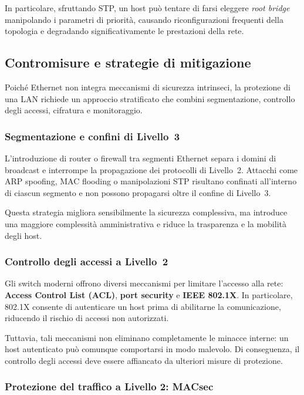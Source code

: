 In particolare, sfruttando STP, un host può tentare di farsi eleggere \emph{root bridge}
manipolando i parametri di priorità, causando riconfigurazioni frequenti della topologia
e degradando significativamente le prestazioni della rete.

\subsection{Contromisure e strategie di mitigazione}

Poiché Ethernet non integra meccanismi di sicurezza intrinseci,
la protezione di una LAN richiede un approccio stratificato che combini
segmentazione, controllo degli accessi, cifratura e monitoraggio.

\subsubsection{Segmentazione e confini di Livello~3}

L’introduzione di router o firewall tra segmenti Ethernet separa i domini di broadcast
e interrompe la propagazione dei protocolli di Livello~2.
Attacchi come ARP spoofing, MAC flooding o manipolazioni STP risultano confinati
all’interno di ciascun segmento e non possono propagarsi oltre il confine di Livello~3.

Questa strategia migliora sensibilmente la sicurezza complessiva,
ma introduce una maggiore complessità amministrativa
e riduce la trasparenza e la mobilità degli host.

\subsubsection{Controllo degli accessi a Livello~2}

Gli switch moderni offrono diversi meccanismi per limitare l’accesso alla rete:
\textbf{Access Control List (ACL)}, \textbf{port security} e \textbf{IEEE 802.1X}.
In particolare, 802.1X consente di autenticare un host prima di abilitarne la comunicazione,
riducendo il rischio di accessi non autorizzati.

Tuttavia, tali meccanismi non eliminano completamente le minacce interne:
un host autenticato può comunque comportarsi in modo malevolo.
Di conseguenza, il controllo degli accessi deve essere affiancato
da ulteriori misure di protezione.

\subsubsection{Protezione del traffico a Livello 2: MACsec}

